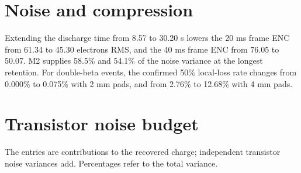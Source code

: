 \documentclass[10pt,a4paper]{article}
\begin{document}
\section{Noise and compression}
Extending the discharge time from 8.57 to 30.20 s lowers the 20 ms frame ENC from 61.34 to 45.30 electrons RMS, and the 40 ms frame ENC from 76.05 to 50.07. M2 supplies 58.5\% and 54.1\% of the noise variance at the longest retention. For double-beta events, the confirmed 50\% local-loss rate changes from 0.000\% to 0.075\% with 2 mm pads, and from 2.76\% to 12.68\% with 4 mm pads.

\section{Transistor noise budget}
The entries are contributions to the recovered charge; independent transistor
noise variances add. Percentages refer to the total variance.
\end{document}
